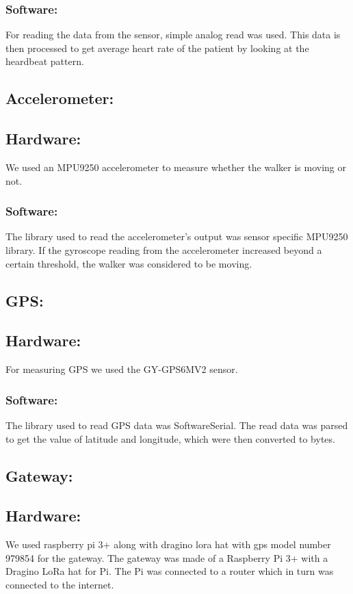 \subsubsection{Software:}
For reading the data from the sensor, simple analog read was used. This data is then processed to get average heart rate of the patient by looking at the heardbeat pattern.



\subsection{Accelerometer:}

\subsection{Hardware:}
We used an MPU9250 accelerometer to measure whether the walker is moving or not.

\subsubsection{Software:}
The library used to read the accelerometer's output was sensor specific MPU9250 library. If the gyroscope reading from the accelerometer increased beyond a certain threshold, the walker was considered to be moving.


\subsection{GPS:}

\subsection{Hardware:}
For measuring GPS we used the GY-GPS6MV2 sensor.

\subsubsection{Software:}
The library used to read GPS data was SoftwareSerial. The read data was parsed to get the value of latitude and longitude, which were then converted to bytes.



\subsection{Gateway:}

\subsection{Hardware:}
We used raspberry pi 3+ along with dragino lora hat with gps model number 979854 for the gateway.
The gateway was made of a Raspberry Pi 3+ with a Dragino LoRa hat for Pi. The Pi was connected to a router which in turn was connected to the internet.


